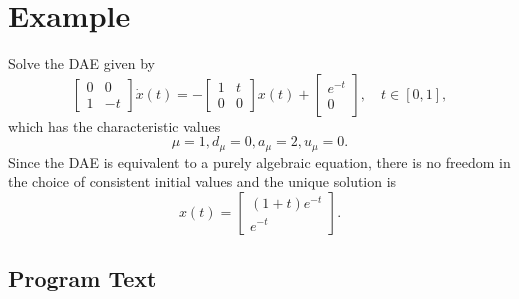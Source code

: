 \section{Example} 

Solve the DAE given by
$$\left[\begin{array}{cc} 0&0\\1&-t \end{array}\right] \dot{x}(t) 
  = -\left[\begin{array}{cc}1&t\\0&0 \end{array}\right] x(t) +
  \left[\begin{array}{c}e^{-t}\\0\end{array}\right],\quad t\in [0,1],$$
which has the characteristic values
$$\mu = 1, d_{\mu} = 0, a_{\mu} = 2, u_{\mu} = 0.$$
Since the DAE is equivalent to a purely algebraic equation, there is
no freedom in the choice of consistent initial values and the
unique solution is
$$x(t) = \left[\begin{array}{c}(1+t)e^{-t}\\e^{-t}\end{array}\right].$$

\subsection{Program Text}

